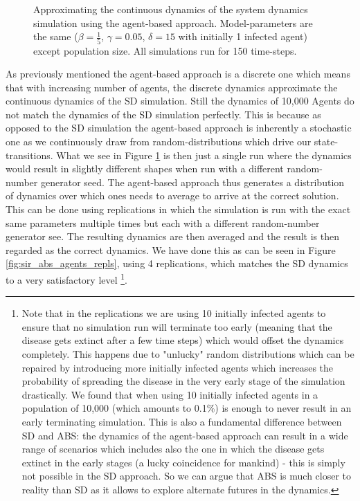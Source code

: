 \begin{figure}
\begin{center}
	\caption{Approximating the continuous dynamics of the system dynamics simulation using the agent-based approach. Model-parameters are the same ($\beta = \frac{1}{5}$, $\gamma = 0.05$, $\delta = 15$ with initially 1 infected agent) except population size. All simulations run for 150 time-steps.} 
	\label{fig:sir_abs_anylogic_agents}
\end{center}
\end{figure}

As previously mentioned the agent-based approach is a discrete one which means that with increasing number of agents, the discrete dynamics approximate the continuous dynamics of the SD simulation. Still the dynamics of 10,000 Agents do not match the dynamics of the SD simulation perfectly. This is because as opposed to the SD simulation the agent-based approach is inherently a stochastic one as we continuously draw from random-distributions which drive our state-transitions. What we see in Figure \ref{fig:sir_abs_anylogic_agents} is then just a single run where the dynamics would result in slightly different shapes when run with a different random-number generator seed. The agent-based approach thus generates a distribution of dynamics over which ones needs to average to arrive at the correct solution. This can be done using replications in which the simulation is run with the exact same parameters multiple times but each with a different random-number generator see. The resulting dynamics are then averaged and the result is then regarded as the correct dynamics.
We have done this as can be seen in Figure \ref{fig:sir_abs_agents_repls}, using 4 replications, which matches the SD dynamics to a very satisfactory level \footnote{Note that in the replications we are using 10 initially infected agents to ensure that no simulation run will terminate too early (meaning that the disease gets extinct after a few time steps) which would offset the dynamics completely. This happens due to "unlucky" random distributions which can be repaired by introducing more initially infected agents which increases the probability of spreading the disease in the very early stage of the simulation drastically. We found that when using 10 initially infected agents in a population of 10,000 (which amounts to 0.1\%) is enough to never result in an early terminating simulation. This is also a fundamental difference between SD and ABS: the dynamics of the agent-based approach can result in a wide range of scenarios which includes also the one in which the disease gets extinct in the early stages (a lucky coincidence for mankind) - this is simply not possible in the SD approach. So we can argue that ABS is much closer to reality than SD as it allows to explore alternate futures in the dynamics.}.

